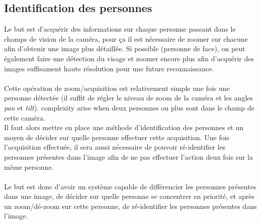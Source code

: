 \documentclass[12pt]{article}
\begin{document}
\subsection{Identification des personnes}
Le but est d'acquérir des informations sur chaque personne passant dans le champs de vision de la caméra, pour ça il est nécessaire de zoomer sur chacune afin d'obtenir une image plus détaillée.
Si possible (personne de face), on peut également faire une détection du visage et zoomer encore plus afin d'acquérir des images suffisament haute résolution pour une future reconnaissance.\\
\\
Cette opération de zoom/acquisition est relativement simple une fois une personne détectée (il suffit de régler le niveau de zoom de la caméra et les angles \textit{pan} et \textit{tilt}). complexity arise when deux personnes ou plus sont dans le champ de cette caméra.\\
Il faut alors mettre en place une méthode d'identification des personnes et un moyen de décider sur quelle personne effectuer cette acquisition. Une fois l'acquisition effectuée, il sera aussi nécessaire de pouvoir ré-identifier les personnes présentes dans l'image afin de ne pas effectuer l'action deux fois sur la même personne.\\
\\
Le but est donc d'avoir un système capable de différencier les personnes présentes dans une image, de décider sur quelle personne se concentrer en priorité, et après un zoom/dé-zoom sur cette personne, de ré-identifier les personnes présentes dans l'image.
\end{document}
